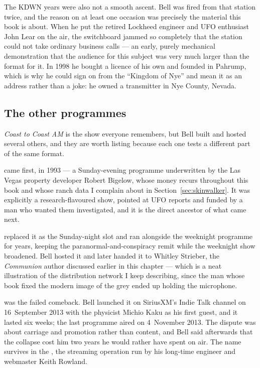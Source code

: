 The KDWN years were also not a smooth ascent. Bell was fired from that station twice, and the reason on
at least one occasion was precisely the material this book is about. When he put the retired Lockheed
engineer and UFO enthusiast John Lear on the air, the switchboard jammed so completely that the station
could not take ordinary business calls --- an early, purely mechanical demonstration that the audience
for this subject was very much larger than the format for it. In 1998 he bought a licence of his own and
founded  in Pahrump, which is why he could sign on from the ``Kingdom of Nye'' and mean
it as an address rather than a joke: he owned a transmitter in Nye County, Nevada.

\subsection{The other programmes}\label{sec:bellothershows}

\emph{Coast to Coast AM} is the show everyone remembers, but Bell built and hosted several others, and
they are worth listing because each one tests a different part of the same format.

 came first, in 1993 --- a Sunday-evening programme underwritten by the Las Vegas
property developer Robert Bigelow, whose money recurs throughout this book and whose ranch data I
complain about in Section~\ref{sec:skinwalker}. It was explicitly a research-flavoured show, pointed at
UFO reports and funded by a man who wanted them investigated, and it is the direct ancestor of what
came next.

 replaced it as the Sunday-night slot and ran alongside the weeknight programme for
years, keeping the paranormal-and-conspiracy remit while the weeknight show broadened. Bell hosted it
and later handed it to Whitley Strieber, the \emph{Communion} author discussed earlier in this chapter
--- which is a neat illustration of the distribution network I keep describing, since the man whose book
fixed the modern image of the grey ended up holding the microphone.

 was the failed comeback. Bell launched it on SiriusXM's Indie Talk channel on
16~September 2013 with the physicist Michio Kaku as his first guest, and it lasted six weeks; the last
programme aired on 4~November 2013. The dispute was about carriage and promotion rather than content,
and Bell said afterwards that the collapse cost him two years he would rather have spent on air. The
name survives in the , the streaming operation run by his long-time
engineer and webmaster Keith Rowland.

